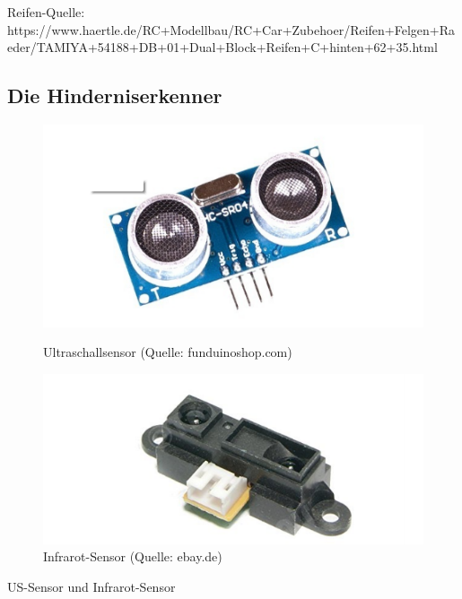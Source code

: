 Reifen-Quelle:
https://www.haertle.de/RC+Modellbau/RC+Car+Zubehoer/Reifen+Felgen+Raeder/TAMIYA+54188+DB+01+Dual+Block+Reifen+C+hinten+62+35.html


\subsection{Die Hinderniserkenner}

\begin{figure}[htb]
	\centering
	\begin{minipage}{0.45\linewidth}
		\centering
		\includegraphics[scale=0.5]{images/Bild-1-1.png}
		\caption{Ultraschallsensor \newline(Quelle: funduinoshop.com)}
		\label{bild_1.2}
	\end{minipage}
	\begin{minipage}{0.45\linewidth}
		\centering
		\includegraphics[scale=0.5]{images/infrarot.png}
		\caption{Infrarot-Sensor \newline (Quelle: ebay.de)}
	\end{minipage}
\end{figure}
US-Sensor und Infrarot-Sensor

